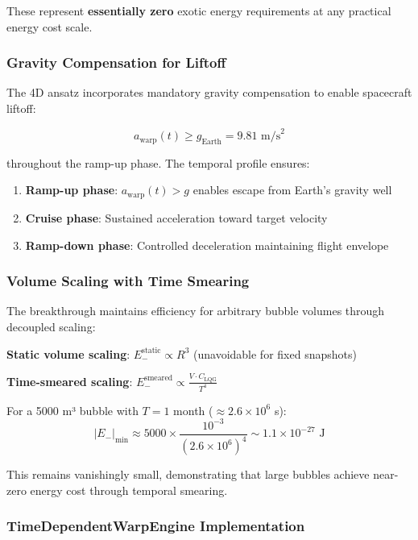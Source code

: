\documentclass[12pt,a4paper]{article}
\begin{document}
These represent \textbf{essentially zero} exotic energy requirements at any practical energy cost scale.

\subsubsection{Gravity Compensation for Liftoff}

The 4D ansatz incorporates mandatory gravity compensation to enable spacecraft liftoff:

\begin{equation}
a_{\text{warp}}(t) \geq g_{\text{Earth}} = 9.81 \text{ m/s}^2
\end{equation}

throughout the ramp-up phase. The temporal profile ensures:

\begin{enumerate}
\item \textbf{Ramp-up phase}: $a_{\text{warp}}(t) > g$ enables escape from Earth's gravity well
\item \textbf{Cruise phase}: Sustained acceleration toward target velocity
\item \textbf{Ramp-down phase}: Controlled deceleration maintaining flight envelope
\end{enumerate}

\subsubsection{Volume Scaling with Time Smearing}

The breakthrough maintains efficiency for arbitrary bubble volumes through decoupled scaling:

\textbf{Static volume scaling}: $E_-^{\text{static}} \propto R^3$ (unavoidable for fixed snapshots)

\textbf{Time-smeared scaling}: $E_-^{\text{smeared}} \propto \frac{V \cdot C_{\text{LQG}}}{T^4}$

For a 5000 m³ bubble with $T = 1$ month ($\approx 2.6 \times 10^6$ s):
\begin{equation}
|E_-|_{\min} \approx 5000 \times \frac{10^{-3}}{(2.6 \times 10^6)^4} \sim 1.1 \times 10^{-27} \text{ J}
\end{equation}

This remains vanishingly small, demonstrating that large bubbles achieve near-zero energy cost through temporal smearing.

\subsubsection{TimeDependentWarpEngine Implementation}
\end{document}
